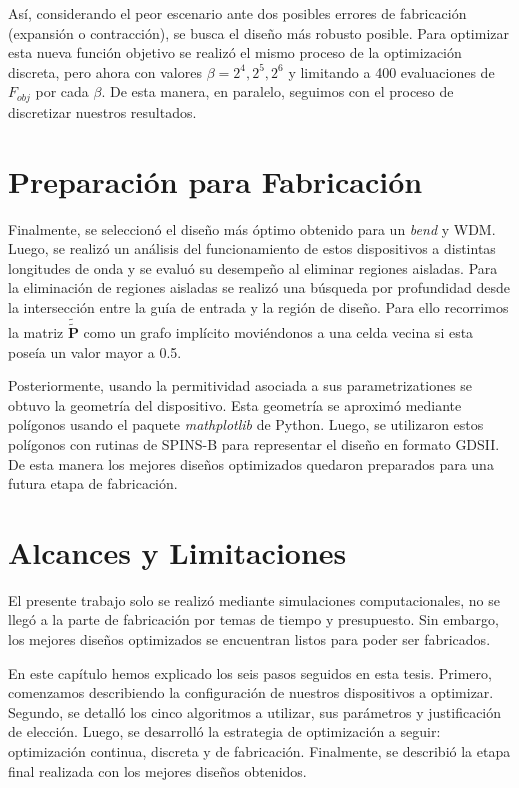 Así, considerando el peor escenario ante dos posibles errores de fabricación (expansión o contracción),
se busca el diseño más robusto posible.
Para optimizar esta nueva función objetivo se realizó el mismo proceso de la optimización discreta, pero ahora
con valores $\beta = 2^4, 2^5, 2^6$ y limitando a 400 evaluaciones de $F_{obj}$ por cada $\beta$. 
De esta manera, en paralelo, seguimos con el proceso de discretizar
nuestros resultados.

\section{Preparación para Fabricación}

Finalmente, se seleccionó el diseño más óptimo obtenido para un \emph{bend} y WDM.
Luego, se realizó un análisis del funcionamiento de estos dispositivos a distintas longitudes de onda
y se evaluó su desempeño al eliminar regiones aisladas.
Para la eliminación de regiones aisladas se realizó una búsqueda por profundidad
desde la intersección entre la guía de entrada y la región de diseño.
Para ello recorrimos la matriz $\widetilde{\widetilde{\boldsymbol{P}}}$ como un grafo implícito moviéndonos a una celda
vecina si esta poseía un valor mayor a 0.5.

Posteriormente, usando la permitividad asociada a sus parametrizationes se obtuvo la geometría del dispositivo.
Esta geometría se aproximó mediante polígonos usando el paquete \emph{mathplotlib} de Python.
Luego, se utilizaron estos polígonos con rutinas de SPINS-B
para representar el diseño en formato GDSII.
De esta manera los mejores diseños optimizados quedaron preparados para una 
futura etapa de fabricación.

\section{Alcances y Limitaciones}

El presente trabajo solo se realizó mediante simulaciones computacionales, no se llegó a la parte de
fabricación por temas de tiempo y presupuesto. Sin embargo, los mejores diseños optimizados se
encuentran listos para poder ser fabricados.

En este capítulo hemos explicado los seis pasos seguidos en esta tesis.
Primero, comenzamos describiendo la configuración de nuestros dispositivos a optimizar.
Segundo, se detalló los cinco algoritmos a utilizar, sus parámetros y justificación de elección.
Luego, se desarrolló la estrategia de optimización a seguir: optimización continua, discreta y de fabricación.
Finalmente, se describió la etapa final realizada con los mejores diseños obtenidos.
